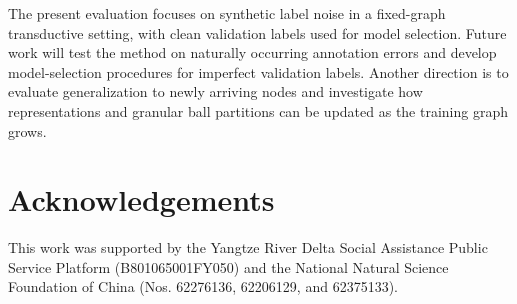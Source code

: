 \documentclass[10pt,letterpaper,nopreprintline]{elsarticle}
\theoremstyle{plain}
\begin{document}
The present evaluation focuses on synthetic label noise in a fixed-graph transductive setting, with clean validation labels used for model selection. Future work will test the method on naturally occurring annotation errors and develop model-selection procedures for imperfect validation labels. Another direction is to evaluate generalization to newly arriving nodes and investigate how representations and granular ball partitions can be updated as the training graph grows.

\FloatBarrier

\section*{Acknowledgements}

This work was supported by the Yangtze River Delta Social Assistance Public Service Platform (B801065001FY050) and the National Natural Science Foundation of China (Nos. 62276136, 62206129, and 62375133).

\setlength{\bibsep}{0.5pt plus 0.2pt minus 0.2pt}



\end{document}
